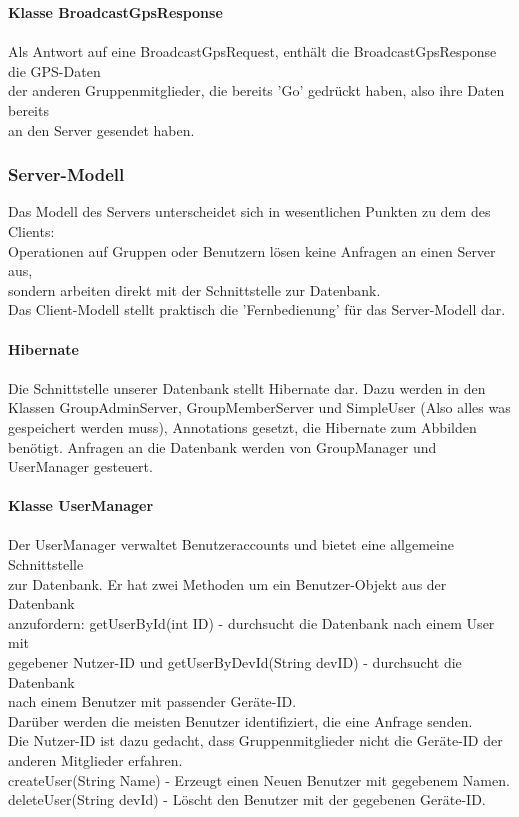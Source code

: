\textbf{Klasse BroadcastGpsResponse}\\
\\
Als Antwort auf eine BroadcastGpsRequest, enthält die BroadcastGpsResponse die GPS-Daten\\
der anderen Gruppenmitglieder, die bereits 'Go' gedrückt haben, also ihre Daten bereits\\
an den Server gesendet haben.\\
\newpage

\subsubsection{Server-Modell}
Das Modell des Servers unterscheidet sich in wesentlichen Punkten zu dem des Clients:\\
Operationen auf Gruppen oder Benutzern lösen keine Anfragen an einen Server aus,\\
sondern arbeiten direkt mit der Schnittstelle zur Datenbank.\\
Das Client-Modell stellt praktisch die 'Fernbedienung' für das Server-Modell dar.\\
\\
\textbf{Hibernate}\\
\\
Die Schnittstelle unserer Datenbank stellt Hibernate dar. Dazu werden in den Klassen
GroupAdminServer, GroupMemberServer und SimpleUser (Also alles was gespeichert werden muss), Annotations gesetzt, die Hibernate zum Abbilden benötigt.
Anfragen an die Datenbank werden von GroupManager und UserManager gesteuert.\\
\\
\textbf{Klasse UserManager}\\
\\
Der UserManager verwaltet Benutzeraccounts und bietet eine allgemeine Schnittstelle\\
zur Datenbank. Er hat zwei Methoden um ein Benutzer-Objekt aus der Datenbank\\
anzufordern: getUserById(int ID) - durchsucht die Datenbank nach einem User mit\\
gegebener Nutzer-ID und getUserByDevId(String devID) - durchsucht die Datenbank\\
nach einem Benutzer mit passender Geräte-ID. \\
Darüber werden die meisten Benutzer identifiziert, die eine Anfrage senden.\\
Die Nutzer-ID ist dazu gedacht, dass Gruppenmitglieder nicht die Geräte-ID der \\
anderen Mitglieder erfahren.\\
createUser(String Name) - Erzeugt einen Neuen Benutzer mit gegebenem Namen.\\
deleteUser(String devId) - Löscht den Benutzer mit der gegebenen Geräte-ID.\\
\\ \\ \\

